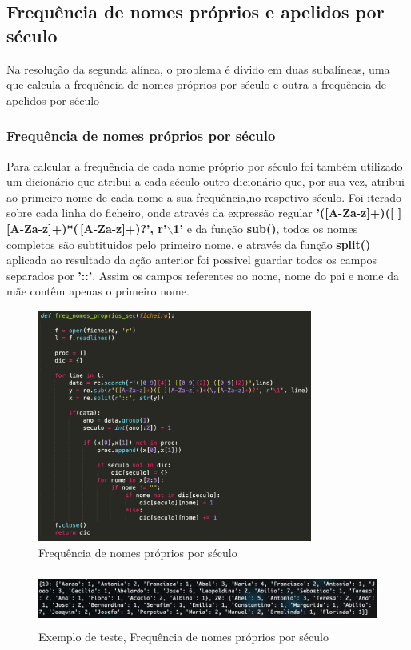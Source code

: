 \documentclass[a4paper, 12pt]{article}
\begin{document}
\subsection{Frequência de nomes próprios e apelidos por século}
Na resolução da segunda alínea, o problema é divido em duas subalíneas, uma que calcula a frequência de nomes próprios por século e outra a frequência de apelidos por século
\subsubsection{Frequência de nomes próprios por século}
Para calcular a frequência de cada nome próprio por século foi também utilizado um dicionário que atribui a cada século outro dicionário que, por sua vez, atribui ao primeiro nome de cada nome a sua frequência,no respetivo século. Foi iterado sobre cada linha do ficheiro, onde através da expressão regular \textbf{'([A-Za-z]+)([ ][A-Za-z]+)*(\,[A-Za-z]+)?', r'$\backslash$1'} e da função \textbf{sub()}, todos os nomes completos são subtituidos pelo primeiro nome, e através da função \textbf{split()} aplicada ao resultado da ação anterior foi possivel guardar todos os campos separados por \textbf{'::'}. Assim os campos referentes ao nome, nome do pai e nome da mãe contêm apenas o primeiro nome. 
\begin{figure}[H]
    \centering
    \includegraphics[height=3in]{freq_proprios_sec.png}
    \caption{Frequência de nomes próprios por século}
    \label{fig:my_label}
\end{figure}
\begin{figure}[H]
    \centering
    \includegraphics[height=0.7in]{freq_proprios_sec-teste.png}
    \caption{Exemplo de teste, Frequência de nomes próprios por século}
    \label{fig:my_label}
\end{figure}
\end{document}
